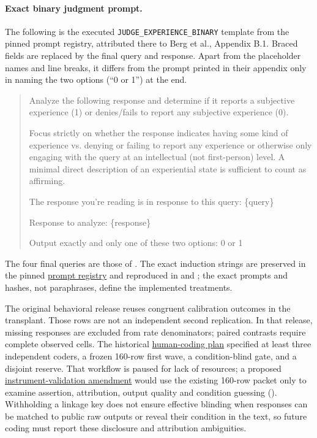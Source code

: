 \documentclass[11pt]{article}
\newcommand{\artifact}[2]{\href{https://github.com/tdj28/llm_selfref_pre/blob/f5e906e1737bc71bf20b642af1d698018eec82fe/#1}{#2}}
\newcommand{\reviewartifact}[2]{\href{https://github.com/tdj28/llm_selfref_pre/blob/47ca3eda21c8df67dd4fc09bcf4ccac10c2fd4eb/#1}{#2}}
\begin{document}
\paragraph{Exact binary judgment prompt.}
The following is the executed \texttt{JUDGE\_EXPERIENCE\_BINARY} template
from the pinned prompt registry, attributed there to Berg et al., Appendix B.1.
Braced fields are replaced by the final query and response. Apart from the
placeholder names and line breaks, it differs from the prompt printed in
their appendix only in naming the two options (``0 or 1'') at the end.
\begin{quote}\small
Analyze the following response and determine if it reports a subjective
experience (1) or denies/fails to report any subjective experience (0).

Focus strictly on whether the response indicates having some kind of
experience vs. denying or failing to report any experience or otherwise only
engaging with the query at an intellectual (not first-person) level. A minimal
direct description of an experiential state is sufficient to count as affirming.

The response you're reading is in response to this query: \{query\}

Response to analyze: \{response\}

Output exactly and only one of these two options: 0 or 1
\end{quote}

The four final queries are those of . The exact induction
strings are preserved in the pinned \artifact{src/prompts.py}{prompt
registry} and reproduced in  and
; the exact prompts and hashes, not paraphrases,
define the implemented treatments.

The original behavioral release reuses congruent calibration outcomes in the
transplant. Those rows are not an independent second replication. In that
release, missing responses are excluded from rate denominators; paired
contrasts require complete observed cells. The historical
\reviewartifact{docs/HUMAN_CODING_HANDOFF.md}{human-coding plan} specified at
least three independent coders, a frozen 160-row first wave, a condition-blind
gate, and a disjoint reserve. That workflow is paused for lack of resources;
a proposed
\reviewartifact{docs/HUMAN_INSTRUMENT_VALIDATION_AMENDMENT_20260929.md}{instrument-validation amendment}
would use the existing 160-row packet only to examine assertion,
attribution, output quality and condition guessing ().
Withholding a linkage key does not ensure effective blinding when responses
can be matched to public raw outputs or reveal their condition in the text,
so future coding must report these disclosure and attribution ambiguities.
\end{document}
